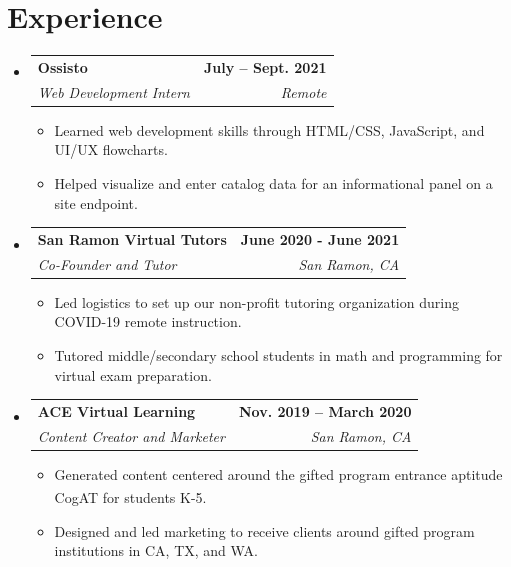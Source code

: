 \documentclass[letterpaper,11pt]{article}
\makeatletter
\newcommand{\resumeItem}[1]{
  \item\small{
    {#1 \vspace{-2pt}}
  }
}
\newcommand{\resumeSubheading}[4]{
  \vspace{-2pt}\item
    \begin{tabular*}{1.0\textwidth}[t]{l@{\extracolsep{\fill}}r}
      \textbf{#1} & \textbf{\small #2} \\
      \textit{\small#3} & \textit{\small #4} \\
    \end{tabular*}\vspace{-7pt}
}
\newcommand{\resumeSubHeadingListStart}{\begin{itemize}[leftmargin=0.0in, label={}]}
\newcommand{\resumeSubHeadingListEnd}{\end{itemize}}
\newcommand{\resumeItemListStart}{\begin{itemize}}
\newcommand{\resumeItemListEnd}{\end{itemize}\vspace{-5pt}}
\makeatother
\begin{document}
\section{Experience}
\resumeSubHeadingListStart

\resumeSubheading
{Ossisto}{July -- Sept. 2021}
{Web Development Intern}{Remote}
\resumeItemListStart
\resumeItem{Learned web development skills through HTML/CSS, JavaScript, and UI/UX flowcharts.}
\resumeItem{Helped visualize and enter catalog data for an informational panel on a site endpoint.}
\resumeItemListEnd

\resumeSubheading
{San Ramon Virtual Tutors}{June 2020 - June 2021}
{Co-Founder and Tutor}{San Ramon, CA}
\resumeItemListStart
\resumeItem{Led logistics to set up our non-profit tutoring organization during COVID-19 remote instruction.}
\resumeItem{Tutored middle/secondary school students in math and programming for virtual exam preparation.}
\resumeItemListEnd

\resumeSubheading
{ACE Virtual Learning}{Nov. 2019 -- March 2020}
{Content Creator and Marketer}{San Ramon, CA}
\resumeItemListStart
\resumeItem{Generated content centered around the gifted program entrance aptitude CogAT\textsuperscript{\textregistered} for students K-5.}
\resumeItem{Designed and led marketing to receive clients around gifted program institutions in CA, TX, and WA.}
\resumeItemListEnd

\resumeSubHeadingListEnd
\vspace{-15pt}

\end{document}
